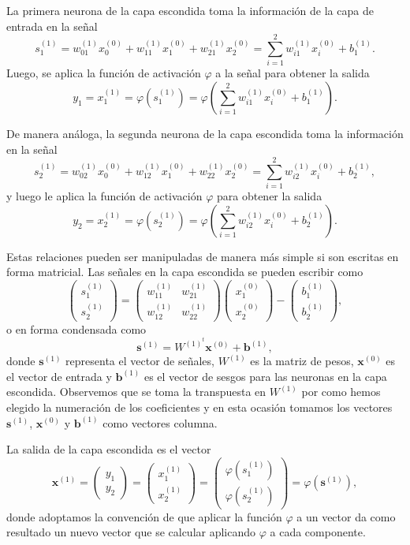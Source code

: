 \documentclass[12pt, a4paper]{amsbook}
\newcommand{\sbf}{{\mathbf s}}
\newcommand{\xx}{{\mathbf x}}
\newcommand{\bb}{{\mathbf b}}
\theoremstyle{remark}
\theoremstyle{definition}
\numberwithin{section}{chapter}
\numberwithin{subsection}{section}
\numberwithin{equation}{section}
\numberwithin{figure}{chapter}
\begin{document}
La primera neurona de la capa escondida toma la información de la capa de entrada en la señal
$$
s_1^{(1)} = w_{01}^{(1)}  x_0^{(0)} + w_{11}^{(1)}  x_1^{(0)} + w_{21}^{(1)}  x_2^{(0)} = \sum_{i=1}^2 w_{i1}^{(1)}  x_i^{(0)} + b_1^{(1)}.
$$
Luego, se aplica la función de activación $\varphi$ a la señal para obtener la salida
$$
y_1 = x_1^{(1)} = \varphi(s_1^{(1)}) = \varphi\left(\sum_{i=1}^2 w_{i1}^{(1)}  x_i^{(0)} + b_1^{(1)}\right).
$$

De manera análoga, la segunda neurona de la capa escondida toma la información en la señal
$$
s_2^{(1)} = w_{02}^{(1)}  x_0^{(0)} + w_{12}^{(1)}  x_1^{(0)} + w_{22}^{(1)}  x_2^{(0)} = \sum_{i=1}^2 w_{i2}^{(1)}  x_i^{(0)} + b_2^{(1)},
$$
y luego le aplica la función de activación $\varphi$ para obtener la salida
$$
y_2 = x_2^{(1)} = \varphi(s_2^{(1)}) = \varphi\left(\sum_{i=1}^2 w_{i2}^{(1)}  x_i^{(0)} + b_2^{(1)}\right).
$$

Estas relaciones pueden ser manipuladas de manera más simple si son escritas en forma matricial. Las señales en la capa escondida se pueden escribir como
$$
\begin{pmatrix}
s_1^{(1)} \\
s_2^{(1)}
\end{pmatrix} =
\begin{pmatrix}
w_{11}^{(1)} & w_{21}^{(1)}\\
w_{12}^{(1)} & w_{22}^{(1)}
\end{pmatrix}
\begin{pmatrix}
x_1^{(0)} \\
x_2^{(0)}
\end{pmatrix} - 
\begin{pmatrix}
b_1^{(1)} \\
b_2^{(1)}
\end{pmatrix},
$$
o en forma condensada como
$$
\sbf^{(1)} = W^{(1)^t} \xx^{(0)} + \bb^{(1)},
$$
donde $\sbf^{(1)}$ representa el vector de señales, $W^{(1)}$ es la matriz de pesos, $\xx^{(0)}$ es el vector de entrada y $\bb^{(1)}$ es el vector de sesgos para las neuronas en la capa escondida. Observemos que se toma la transpuesta en $W^{(1)}$ por como hemos elegido la numeración de los coeficientes y en esta ocasión tomamos los vectores  $\sbf^{(1)}$, $\xx^{(0)}$ y $\bb^{(1)}$ como vectores columna.

La salida de la capa escondida es el vector
$$
\xx^{(1)} = \begin{pmatrix}
y_1 \\
y_2
\end{pmatrix} = \begin{pmatrix}
x_1^{(1)} \\
x_2^{(1)}
\end{pmatrix} = \begin{pmatrix}
\varphi(s_1^{(1)}) \\
\varphi(s_2^{(1)})
\end{pmatrix} = \varphi(\sbf^{(1)}),
$$
donde adoptamos la convención de que aplicar la función $\varphi$ a un vector da como resultado un nuevo vector que se calcular aplicando $\varphi$ a cada componente.
\end{document}
